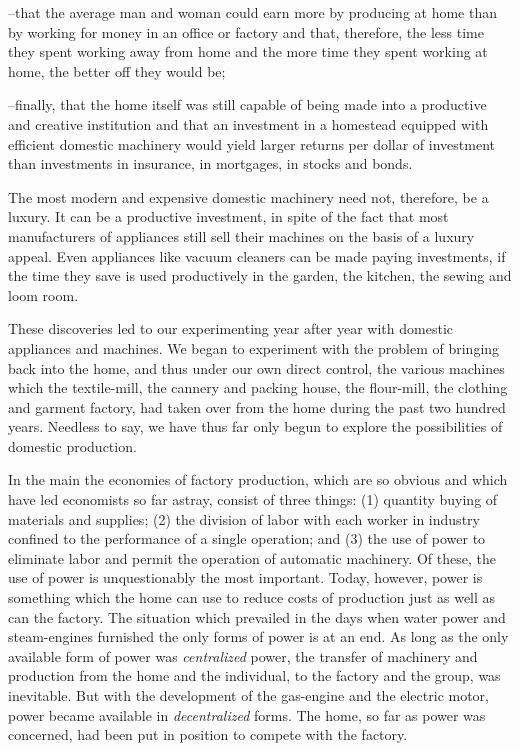 \documentclass{book}
\begin{document}
–that the average man and woman could earn more by producing at home than by working for money in an office or factory and that, therefore, the less time they spent working away from home and the more time they spent working at home, the better off they would be;

–finally, that the home itself was still capable of being made into a productive and creative institution and that an investment in a homestead equipped with efficient domestic machinery would yield larger returns per dollar of investment than investments in insurance, in mortgages, in stocks and bonds.

The most modern and expensive domestic machinery need not, therefore, be a luxury. It can be a productive investment, in spite of the fact that most manufacturers of appliances still sell their machines on the basis of a luxury appeal. Even appliances like vacuum cleaners can be made paying investments, if the time they save is used productively in the garden, the kitchen, the sewing and loom room.

These discoveries led to our experimenting year after year with domestic appliances and machines. We began to experiment with the problem of bringing back into the home, and thus under our own direct control, the various machines which the textile-mill, the cannery and packing house, the flour-mill, the clothing and garment factory, had taken over from the home during the past two hundred years. Needless to say, we have thus far only begun to explore the possibilities of domestic production.

In the main the economies of factory production, which are so obvious and which have led economists so far astray, consist of three things: (1) quantity buying of materials and supplies; (2) the division of labor with each worker in industry confined to the performance of a single operation; and (3) the use of power to eliminate labor and permit the operation of automatic machinery. Of these, the use of power is unquestionably the most important. Today, however, power is something which the home can use to reduce costs of production just as well as can the factory. The situation which prevailed in the days when water power and steam-engines furnished the only forms of power is at an end. As long as the only available form of power was \emph{centralized} power, the transfer of machinery and production from the home and the individual, to the factory and the group, was inevitable. But with the development of the gas-engine and the electric motor, power became available in \emph{decentralized} forms. The home, so far as power was concerned, had been put in position to compete with the factory.
\end{document}
